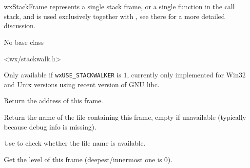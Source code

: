 
\section{}\label{wxstackframe}


wxStackFrame represents a single stack frame, or a single function in the call
stack, and is used exclusively together with 
, see there for a more detailed
discussion.



No base class


<wx/stackwalk.h>

Only available if \texttt{wxUSE\_STACKWALKER} is $1$, currently only
implemented for Win32 and Unix versions using recent version of GNU libc.






\label{wxstackframegetaddress}


Return the address of this frame.


\label{wxstackframegetfilename}


Return the name of the file containing this frame, empty if
unavailable (typically because debug info is missing).

Use  to check whether
the file name is available.


\label{wxstackframegetlevel}


Get the level of this frame (deepest/innermost one is $0$).


